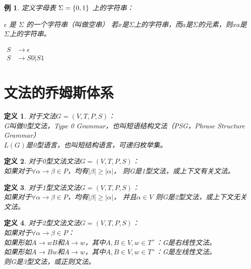 \documentclass[oneside]{ctexbook}
\DeclarePairedDelimiter{\set}{\{}{\}}
\newtheorem{definition}{定义}[section]
\newtheorem{example}{例}[section]
\begin{document}
\begin{example}
    定义字母表 $\Sigma = \set{0,1}$ 上的字符串：
    \begin{outline}
        \1 $\epsilon$ 是 $\Sigma$ 的一个字符串（叫做空串）
        \1 若$x$是$\Sigma$上的字符串，而$a$是$\Sigma$的元素，则$xa$是$\Sigma$上的字符串。
    \end{outline}

    $
    \begin{aligned}
        S & \to \epsilon \\
        S & \to S0 | S1
    \end{aligned}
    $
\end{example}


\section{文法的乔姆斯体系}
\begin{definition}
    对于文法$G = (V,T,P,S)$： \\
    G叫做0型文法，Type 0 Grammar，也叫短语结构文法（PSG，Phrase Structure Grammar） \\
    $L(G)$是0型语言，也叫短结构语言，可递归枚举集。
\end{definition}
\begin{definition}
    对于0型文法文法$G = (V,T,P,S)$： \\
    如果对于$\forall \alpha \to \beta \in P$，均有$|\beta| \geq |\alpha|$，
    则G是1型文法，或上下文有关文法。
\end{definition}
\begin{definition}
    对于1型文法文法$G = (V,T,P,S)$： \\
    如果对于$\forall \alpha \to \beta \in P$，均有$|\beta| \geq |\alpha|$，
    并且$\alpha \in V$
    则G是2型文法，或上下文无关文法。
\end{definition}
\begin{definition}
    对于2型文法文法$G = (V,T,P,S)$： \\
    如果对于$\forall \alpha \to \beta \in P$： \\
    如果形如$A \to wB$和$A \to w$，其中$A,B \in V, w \in T^+$：G是右线性文法。 \\
    如果形如$A \to Bw$和$A \to w$，其中$A,B \in V, w \in T^+$：G是左线性文法。 \\
    则G是3型文法，或正则文法。
\end{definition}
\end{document}
